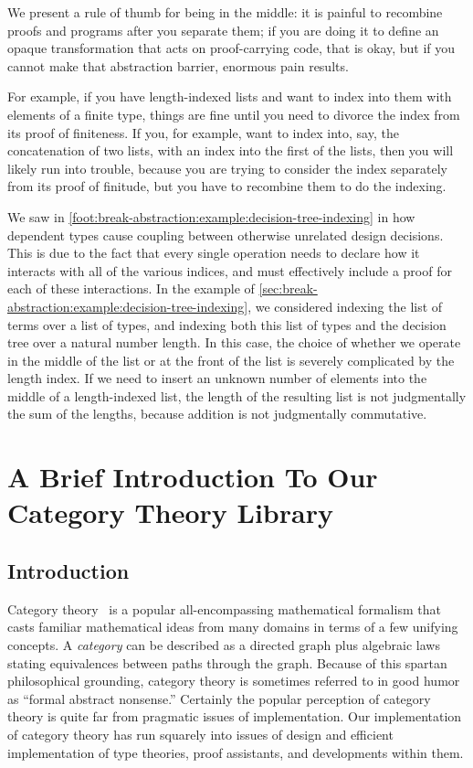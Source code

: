 We present a rule of thumb for being in the middle:
it is painful to recombine proofs and programs after you separate them;
if you are doing it to define an opaque transformation that acts on proof-carrying code, that is okay, but if you cannot make that abstraction barrier, enormous pain results.

For example, if you have length-indexed lists and want to index into them with elements of a finite type, things are fine until you need to divorce the index from its proof of finiteness.
If you, for example, want to index into, say, the concatenation of two lists, with an index into the first of the lists, then you will likely run into trouble, because you are trying to consider the index separately from its proof of finitude, but you have to recombine them to do the indexing.

We saw in \autoref{foot:break-abstraction:example:decision-tree-indexing} in  how dependent types cause coupling between otherwise unrelated design decisions.
This is due to the fact that every single operation needs to declare how it interacts with all of the various indices, and must effectively include a proof for each of these interactions.
In the example of \autoref{sec:break-abstraction:example:decision-tree-indexing}, we considered indexing the list of terms over a list of types, and indexing both this list of types and the decision tree over a natural number length.
In this case, the choice of whether we operate in the middle of the list or at the front of the list is severely complicated by the length index.
If we need to insert an unknown number of elements into the middle of a length-indexed list, the length of the resulting list is not judgmentally the sum of the lengths, because addition is not judgmentally commutative.

\section{A Brief Introduction To Our Category Theory Library}\label{sec:category-theory-library}
\subsection{Introduction}
Category theory~\cite{mac1998categories} is a popular all-encompassing mathematical formalism that casts familiar mathematical ideas from many domains in terms of a few unifying concepts.
A \emph{category} can be described as a directed graph plus algebraic laws stating equivalences between paths through the graph.
Because of this spartan philosophical grounding, category theory is sometimes referred to in good humor as ``formal abstract nonsense.''
Certainly the popular perception of category theory is quite far from pragmatic issues of implementation.
Our implementation of category theory has run squarely into issues of design and efficient implementation of type theories, proof assistants, and developments within them.

